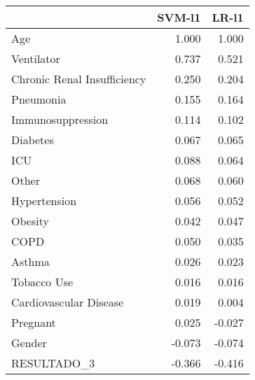 \begin{tabular}{lrr}
\toprule
{} &  SVM-l1 &  LR-l1 \\
\midrule
Age                         &   1.000 &  1.000 \\
Ventilator                  &   0.737 &  0.521 \\
Chronic Renal Insufficiency &   0.250 &  0.204 \\
Pneumonia                   &   0.155 &  0.164 \\
Immunosuppression           &   0.114 &  0.102 \\
Diabetes                    &   0.067 &  0.065 \\
ICU                         &   0.088 &  0.064 \\
Other                       &   0.068 &  0.060 \\
Hypertension                &   0.056 &  0.052 \\
Obesity                     &   0.042 &  0.047 \\
COPD                        &   0.050 &  0.035 \\
Asthma                      &   0.026 &  0.023 \\
Tobacco Use                 &   0.016 &  0.016 \\
Cardiovascular Disease      &   0.019 &  0.004 \\
Pregnant                    &   0.025 & -0.027 \\
Gender                      &  -0.073 & -0.074 \\
RESULTADO\_3                 &  -0.366 & -0.416 \\
\bottomrule
\end{tabular}

